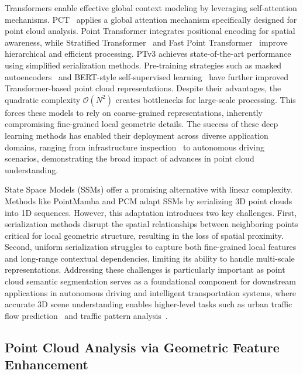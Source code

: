 \documentclass[a4paper,fleqn]{cas-sc}
\begin{document}
Transformers enable effective global context modeling by leveraging self-attention mechanisms. PCT~\cite{PCT} applies a global attention mechanism specifically designed for point cloud analysis. Point Transformer \cite{pt} integrates positional encoding for spatial awareness, while Stratified Transformer~\cite{stratified_transformer} and Fast Point Transformer~\cite{fast_point_transformer} improve hierarchical and efficient processing. PTv3 \cite{ptv3} achieves state-of-the-art performance using simplified serialization methods. Pre-training strategies such as masked autoencoders~\cite{pointmae} and BERT-style self-supervised learning~\cite{Point-BERT} have further improved Transformer-based point cloud representations. Despite their advantages, the quadratic complexity $\mathcal{O}(N^2)$ creates bottlenecks for large-scale processing. This forces these models to rely on coarse-grained representations, inherently compromising fine-grained local geometric details. The success of these deep learning methods has enabled their deployment across diverse application domains, ranging from infrastructure inspection~\cite{bridgePointCloud} to autonomous driving scenarios, demonstrating the broad impact of advances in point cloud understanding.

State Space Models (SSMs) \cite{Mamba} offer a promising alternative with linear complexity. Methods like PointMamba \cite{PointMamba} and PCM \cite{pcm} adapt SSMs by serializing 3D point clouds into 1D sequences. However, this adaptation introduces two key challenges. First, serialization methods disrupt the spatial relationships between neighboring points critical for local geometric structure, resulting in the loss of spatial proximity. Second, uniform serialization struggles to capture both fine-grained local features and long-range contextual dependencies, limiting its ability to handle multi-scale representations. Addressing these challenges is particularly important as point cloud semantic segmentation serves as a foundational component for downstream applications in autonomous driving and intelligent transportation systems, where accurate 3D scene understanding enables higher-level tasks such as urban traffic flow prediction~\cite{ALI1,ALI2} and traffic pattern analysis~\cite{ALI3}.


\subsection{Point Cloud Analysis via Geometric Feature Enhancement}
\end{document}
